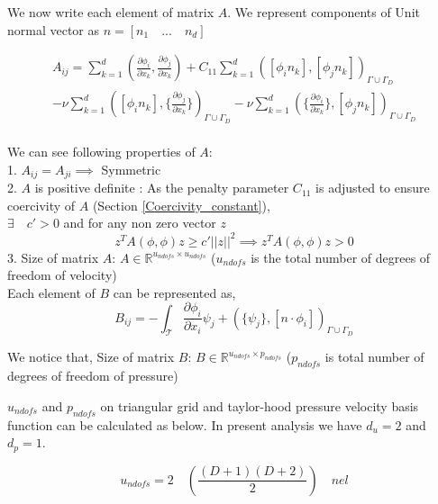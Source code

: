 \documentclass[a4paper,openany]{book}
\begin{document}
We now write each element of matrix $A$. We represent components of Unit normal vector as $n = [n_1 \quad ... \quad n_d]$

\begin{equation} \label{matrix A}
\begin{split}
A_{ij} = \sum_{k=1}^d (\frac{\partial \phi_i}{\partial x_k} , \frac{\partial \phi_j}{\partial x_k}) + C_{11} \sum_{k=1}^d ([\phi_i n_k] , [\phi_j n_k])_{\Gamma \cup \Gamma_D} \\ - \nu \sum_{k=1}^d ([\phi_i n_k] , \lbrace \frac{\partial \phi_j}{\partial x_k} \rbrace)_{\Gamma \cup \Gamma_D} - \nu \sum_{k=1}^d (\lbrace \frac{\partial \phi_i}{\partial x_k} \rbrace , [\phi_j n_k])_{\Gamma \cup \Gamma_D}
\end{split}
\end{equation}
${}$\\
We can see following properties of $A$: 
\\
1. $A_{ij} = A_{ji} \implies$ Symmetric\\
2. $A$ is positive definite : As the penalty parameter $C_{11}$ is adjusted to ensure coercivity of $A$ (Section \ref{Coercivity_constant}),\\
$\exists \quad c' > 0 $ and for any non zero vector $z$
\begin{equation}
z^T A( \phi , \phi ) z \geq c' || z ||^2 \implies z^T A( \phi , \phi ) z > 0
\end{equation}
3. Size of matrix $A$: $A \in \mathbb{R}^{u_{ndofs} \times u_{ndofs}}$ ($u_{ndofs}$ is the total number of degrees of freedom of velocity)\\

Each element of $B$ can be represented as,\\
\begin{equation} \label{matrix B}
B_{ij} = - \int_\mathcal{T} \frac{\partial \phi_i}{\partial x_i} \psi_j + (\lbrace \psi_j \rbrace , [n \cdot \phi_i])_{\Gamma \cup \Gamma_D}
\end{equation}

We notice that, Size of matrix $B$: $B \in \mathbb{R}^{u_{ndofs} \times p_{ndofs}}$ ($p_{ndofs}$ is total number of degrees of freedom of pressure)

$u_{ndofs}$ and $p_{ndofs}$ on triangular grid and taylor-hood pressure velocity basis function can be calculated as below. In present analysis we have $d_u = 2$ and $d_p = 1$.

\begin{equation} \label{undofs}
u_{ndofs} = 2 \quad \left( \frac{(D+1)(D+2)}{2} \right) \quad nel
\end{equation}
\end{document}
